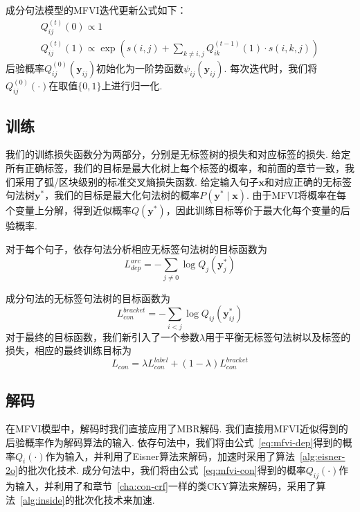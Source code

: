 成分句法模型的MFVI迭代更新公式如下\cite{wang-etal-2019-second}：
\begin{equation}
  \label{eq:mfvi-con}
  \begin{array}{l}
    Q_{ij}^{(t)}(0)\propto 1 \\
    Q_{ij}^{(t)}(1)\propto \exp\left(s(i,j) +\sum_{k\neq i,j} Q_{ik}^{(t-1)}(1)\cdot s(i,k,j) \right)
  \end{array}
\end{equation}
后验概率$Q_{ij}^{(0)}(\boldsymbol{y}_{ij})$初始化为一阶势函数$\psi_{ij}(\boldsymbol{y}_{ij})$.
每次迭代时，我们将$Q_{ij}^{(0)}(\cdot)$在取值$\{0,1\}$上进行归一化.


\subsection{训练}

我们的训练损失函数分为两部分，分别是无标签树的损失和对应标签的损失.
给定所有正确标签，我们的目标是最大化树上每个标签的概率，和前面的章节一致，我们采用了弧/区块级别的标准交叉熵损失函数.
给定输入句子$\boldsymbol{x}$和对应正确的无标签句法树$\boldsymbol{y}^{\ast}$，我们的目标是最大化句法树的概率$P(\boldsymbol{y}^{\ast}\mid\boldsymbol{x})$.
由于MFVI将概率在每个变量上分解，得到近似概率$Q(\boldsymbol{y}^{\ast})$，因此训练目标等价于最大化每个变量的后验概率.

对于每个句子，依存句法分析相应无标签句法树的目标函数为
\begin{equation}
  \label{eq:dep-vi-arc-loss}
  L_{dep}^{arc}=-\sum_{j\neq 0}\log Q_j(\boldsymbol{y}^{\ast}_j)
\end{equation}

成分句法的无标签句法树的目标函数为
\begin{equation}
  \label{eq:con-vi-bracket-loss}
  L_{con}^{bracket}=-\sum_{i<j}\log Q_{ij}(\boldsymbol{y}^{\ast}_{ij})
\end{equation}
对于最终的目标函数，我们新引入了一个参数$\lambda$用于平衡无标签句法树以及标签的损失，相应的最终训练目标为
\begin{equation}
  \label{eq:con-vi-loss}
  L_{con}=\lambda L_{con}^{label}+(1-\lambda)L_{con}^{bracket}
\end{equation}

\subsection{解码}
在MFVI模型中，解码时我们直接应用了MBR解码.
我们直接用MFVI近似得到的后验概率作为解码算法的输入.
依存句法中，我们将由公式~\ref{eq:mfvi-dep}得到的概率$Q_i(\cdot)$作为输入，并利用了Eisner算法来解码，加速时采用了算法~\ref{alg:eisner-2o}的批次化技术.
成分句法中，我们将由公式~\ref{eq:mfvi-con}得到的概率$Q_{ij}(\cdot)$作为输入，并利用了和章节~\ref{cha:con-crf}一样的类CKY算法来解码，采用了算法~\ref{alg:inside}的批次化技术来加速.

